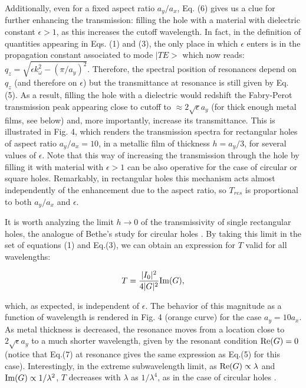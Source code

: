 \documentclass[aps,prl,twocolumn,showpacs,superscriptaddress,floatfix]{revtex4}
\begin{document}
Additionally, even for a fixed aspect ratio $a_y/a_x$, Eq. (6)
gives us a clue for further enhancing the transmission: filling
the hole with a material with dielectric constant $\epsilon > 1$,
as this increases the cutoff wavelength. In fact, in the
definition of quantities appearing in Eqs. (1) and (3), the only
place in which $\epsilon$ enters is in the propagation constant
associated to mode $|TE>$ which now reads: $q_z=\sqrt{\epsilon
k_{\omega}^2-(\pi/a_y)^2}$. Therefore, the spectral position of
resonances depend on $q_z$ (and therefore on $\epsilon$) but the
transmittance at resonance is still given by Eq. (5). As a result,
filling the hole with a dielectric would redshift the Fabry-Perot
transmission peak appearing close to cutoff to $\approx 2
\sqrt{\epsilon} a_y$ (for thick enough metal films, see below)
and, more importantly, increase its transmittance. This is
illustrated in Fig. 4, which renders the transmission spectra for
rectangular holes of aspect ratio $a_y/a_x=10$, in a metallic film
of thickness $h=a_y/3$, for several values of $\epsilon$. Note
that this way of increasing the transmission through the hole by
filling it with material with $\epsilon > 1$ can be also operative
for the case of circular \cite{deAbajo} or square holes.
Remarkably, in rectangular holes this mechanism acts almost
independently of the enhancement due to the aspect ratio, so
$T_{res}$ is proportional to both $a_y/a_x$ and $\epsilon$.

It is worth analyzing the limit $h \rightarrow 0$ of the
transmissivity of single rectangular holes, the analogue of
Bethe's study for circular holes \cite{Bethe}. By taking this
limit in the set of equations (1) and Eq.(3), we can obtain an
expression for $T$ valid for all wavelengths:

\begin{equation}
T=\frac{|I_0|^2}{4|G|^2}{\rm Im}(G),
\end{equation}

\noindent which, as expected, is independent of $\epsilon$. The
behavior of this magnitude as a function of wavelength is rendered
in Fig. 4 (orange curve) for the case $a_y=10a_x$. As metal
thickness is decreased, the resonance moves from a location close
to $2\sqrt{\epsilon}a_y$ to a much shorter wavelength, given by
the resonant condition ${\rm Re}(G)=0$ (notice that Eq.(7) at
resonance gives the same expression as Eq.(5) for this case).
Interestingly, in the extreme subwavelength limit, as ${\rm Re}(G)
\propto \lambda$ and ${\rm Im}(G) \propto 1/\lambda^2$, $T$
decreases with $\lambda$ as $1/\lambda^4$, as in the case of
circular holes \cite{Bethe}.
\end{document}
